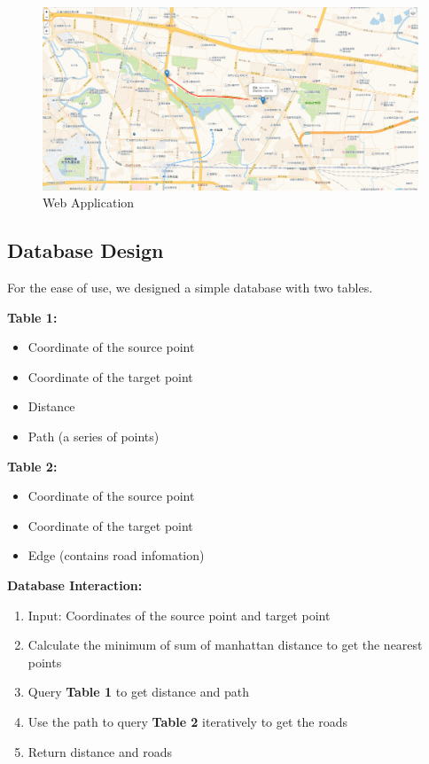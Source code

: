 \documentclass[fontset=none]{ctexart}
\theoremstyle{definition}
\theoremstyle{remark}
\begin{document}
\begin{figure}[htb]
  \centering
  \includegraphics[width=\textwidth]{images/app_example_db.png}
  \caption{Web Application}
  \label{app}
\end{figure}

\subsection{Database Design}
For the ease of use, we designed a simple database with two tables.

\textbf{Table 1:}
\begin{itemize}
  \item Coordinate of the source point
  \item Coordinate of the target point
  \item Distance
  \item Path (a series of points)
\end{itemize}

\textbf{Table 2:}
\begin{itemize}
  \item Coordinate of the source point
  \item Coordinate of the target point
  \item Edge (contains road infomation)
\end{itemize}

\textbf{Database Interaction:}
\begin{enumerate}
  \item Input: Coordinates of the source point and target point
  \item Calculate the minimum of sum of manhattan distance to get the nearest points
  \item Query \textbf{Table 1} to get distance and path
  \item Use the path to query \textbf{Table 2} iteratively to get the roads
  \item Return distance and roads
\end{enumerate}
\end{document}
